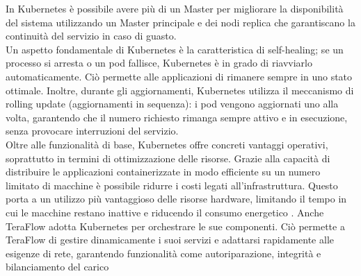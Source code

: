 In Kubernetes è possibile avere più di un Master per migliorare la disponibilità del sistema utilizzando un Master principale e dei nodi replica che garantiscano la continuità del servizio in caso di guasto.
\\Un aspetto fondamentale di Kubernetes è la caratteristica di self-healing; se un processo si arresta o un pod fallisce, Kubernetes è in grado di riavviarlo automaticamente. 
Ciò permette alle applicazioni di rimanere sempre in uno stato ottimale.
Inoltre, durante gli aggiornamenti, Kubernetes utilizza il meccanismo di rolling update (aggiornamenti in sequenza): 
i pod vengono aggiornati uno alla volta, garantendo che il numero richiesto rimanga sempre attivo e in esecuzione, senza provocare interruzioni del servizio. 
\\Oltre alle funzionalità di base, Kubernetes offre concreti vantaggi operativi, soprattutto in termini di ottimizzazione delle risorse. 
Grazie alla capacità di distribuire le applicazioni containerizzate in modo efficiente su un numero limitato di macchine è possibile ridurre i costi legati all'infrastruttura. 
Questo porta a un utilizzo più vantaggioso delle risorse hardware, limitando il tempo in cui le macchine restano inattive e riducendo il consumo energetico \cite{bookub}.
Anche TeraFlow adotta Kubernetes per orchestrare le sue componenti. 
Ciò permette a TeraFlow di gestire dinamicamente i suoi servizi e adattarsi rapidamente alle esigenze di rete, garantendo funzionalità come autoriparazione, integrità e bilanciamento del carico \cite{D14}

